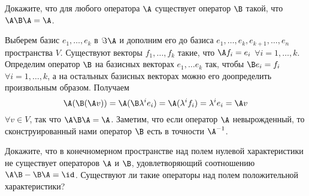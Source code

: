 \begin{problem}
    Докажите, что для любого оператора $\A$ существует оператор $\B$ такой, что $\A\B\A = \A$.
\end{problem}

\begin{solution}
    Выберем базис $e_1, \ldots, e_k$ в $\Im\A$ и дополним его до базиса $e_1, \ldots, e_k, e_{k + 1}, \ldots, e_n$ пространства $V$. Существуют векторы $f_1, \ldots, f_k$ такие, что $\A f_i = e_i$ $\forall i = 1, \ldots, k$. Определим оператор $\B$ на базисных векторах $e_1, \ldots e_k$ так, чтобы $\B e_i = f_i$ $\forall i = 1, \ldots, k$, а на остальных базисных векторах можно его доопределить произвольным образом. Получаем
    \[
        \A(\B(\A v)) = \A(\B \lambda^ie_i) = \A(\lambda^if_i) = \lambda^ie_i = \A v
    \]
    $\forall v \in V$, так что $\A\B\A = \A$. Заметим, что если оператор $\A$ невырожденный, то сконструированный нами оператор $\B$ есть в точности $\A^{-1}$.
\end{solution}

\begin{problem}
    Докажите, что в конечномерном пространстве над полем нулевой характеристики не существует операторов $\A$ и $\B$, удовлетворяющий соотношению $\A\B - \B\A = \id$. Существуют ли такие операторы над полем положительной характеристики?
\end{problem}

